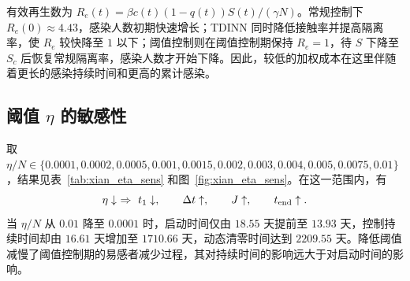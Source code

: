 \documentclass[lang=cn,a4paper,newtx]{elegantpaper}
\numberwithin{equation}{section}
\theoremstyle{plain}
\begin{document}
有效再生数为 $R_e(t)=\beta c(t)(1-q(t))S(t)/(\gamma N)$。常规控制下 $R_e(0)\approx4.43$，感染人数初期快速增长；TDINN 同时降低接触率并提高隔离率，使 $R_e$ 较快降至 $1$ 以下；阈值控制则在阈值控制期保持 $R_e=1$，待 $S$ 下降至 $S_c$ 后恢复常规隔离率，感染人数才开始下降。因此，较低的加权成本在这里伴随着更长的感染持续时间和更高的累计感染。

\subsection{阈值 \texorpdfstring{$\eta$}{eta} 的敏感性}
取 $\eta/N\in\{0.0001,0.0002,0.0005,0.001,0.0015,0.002,0.003,0.004,0.005,0.0075,0.01\}$，结果见表~\ref{tab:xian_eta_sens} 和图~\ref{fig:xian_eta_sens}。在这一范围内，有
\[
\eta\downarrow\ \Rightarrow\ t_1\downarrow,\qquad \Delta t\uparrow,\qquad J\uparrow,\qquad t_{\rm end}\uparrow.
\]
当 $\eta/N$ 从 $0.01$ 降至 $0.0001$ 时，启动时间仅由 $18.55$ 天提前至 $13.93$ 天，控制持续时间却由 $16.61$ 天增加至 $1710.66$ 天，动态清零时间达到 $2209.55$ 天。降低阈值减慢了阈值控制期的易感者减少过程，其对持续时间的影响远大于对启动时间的影响。
\end{document}
